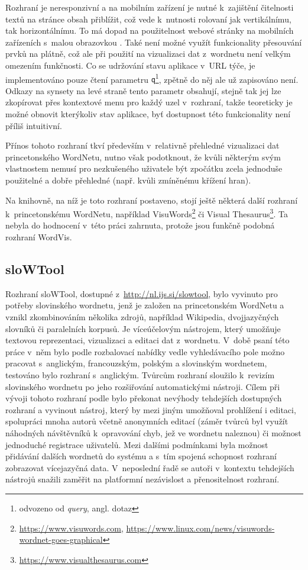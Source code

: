 \documentclass[a4paper, 11pt, oneside, showtrims]{book}
\begin{document}
					Rozhraní je neresponzivní a na mobilním zařízení je nutné k~zajištění čitelnosti textů na stránce obsah přiblížit, což vede k~nutnosti rolovaní jak vertikálnímu, tak horizontálnímu. To má dopad na použitelnost webové stránky na mobilních zařízeních s~malou obrazovkou \parencite{nn2005scrollbar, richards2004web}. Také není možné využít funkcionality přesouvání prvků na plátně, což ale při použití na vizualizaci dat z~wordnetu není velkým omezením funkčnosti. Co se udržování stavu aplikace v~URL týče, je implementováno pouze čtení parametru {\tt q}\footnote{odvozeno od \textit{query}, angl. dotaz}, zpětně do něj ale už zapisováno není. Odkazy na synsety na levé straně tento parametr obsahují, stejně tak jej lze zkopírovat přes kontextové menu pro každý uzel v~rozhraní, takže teoreticky je možné obnovit kterýkoliv stav aplikace, byť dostupnost této funkcionality není příliš intuitivní.

					Přínos tohoto rozhraní tkví především v~relativně přehledné vizualizaci dat princetonského WordNetu, nutno však podotknout, že kvůli některým svým vlastnostem nemusí pro nezkušeného uživatele být zpočátku zcela jednoduše použitelné a dobře přehledné (např. kvůli zmíněnému křížení hran).

					Na knihovně, na níž je toto rozhraní postaveno, stojí ještě některá další rozhraní k~princetonskému WordNetu, například VisuWords\footnote{\url{https://www.visuwords.com}, \url{https://www.linux.com/news/visuwords-wordnet-goes-graphical}} či Visual Thesaurus\footnote{\url{https://www.visualthesaurus.com}}. Ta nebyla do hodnocení v~této práci zahrnuta, protože jsou funkčně podobná rozhraní WordVis.

				\subsection{sloWTool}
				\label{vis:slowtool}

					Rozhraní sloWTool, dostupné z~\url{http://nl.ijs.si/slowtool}, bylo vyvinuto pro potřeby slovinského wordnetu, jenž je založen na princetonském WordNetu a vznikl zkombinováním několika zdrojů, například Wikipedia, dvojjazyčných slovníků či paralelních korpusů. Je víceúčelovým nástrojem, který umožňuje textovou reprezentaci, vizualizaci a editaci dat z~wordnetu. V~době psaní této práce v~něm bylo podle rozbalovací nabídky vedle vyhledávacího pole možno pracovat s~anglickým, francouzským, polským a slovinským wordnetem, testováno bylo rozhraní s~anglickým. Tvůrcům rozhraní sloužilo k~revizím slovinského wordnetu po jeho rozšiřování automatickými nástroji. \parencite{fivser2012slownet} Cílem při vývoji tohoto rozhraní podle \textcite{fivser2011visualizing} bylo překonat nevýhody tehdejších dostupných rozhraní a vyvinout nástroj, který by mezi jiným umožňoval prohlížení i editaci, spolupráci mnoha autorů včetně anonymních editací (záměr tvůrců byl využít náhodných návštěvníků k~opravování chyb, jež ve wordnetu naleznou) či možnost jednoduché registrace uživatelů. Mezi dalšími podmínkami byla možnost přidávání dalších wordnetů do systému a s~tím spojená schopnost rozhraní zobrazovat vícejazyčná data. V~neposlední řadě se autoři v~kontextu tehdejších nástrojů snažili zaměřit na platformní nezávislost a přenositelnost rozhraní. 
\end{document}
